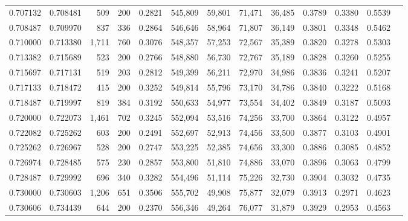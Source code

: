 \begin{tabular}{rrrrrrrrrrrrr}
0.707132 & 0.708481 &   509 & 200 &                                     0.2821 & 545,809 &  59,801 &  71,471 &  36,485 & 0.3789 & 0.3380 & 0.5539 \\
0.708487 & 0.709970 &   837 & 336 &                                     0.2864 & 546,646 &  58,964 &  71,807 &  36,149 & 0.3801 & 0.3348 & 0.5462 \\
0.710000 & 0.713380 & 1,711 & 760 &                                     0.3076 & 548,357 &  57,253 &  72,567 &  35,389 & 0.3820 & 0.3278 & 0.5303 \\
0.713382 & 0.715689 &   523 & 200 &                                     0.2766 & 548,880 &  56,730 &  72,767 &  35,189 & 0.3828 & 0.3260 & 0.5255 \\
0.715697 & 0.717131 &   519 & 203 &                                     0.2812 & 549,399 &  56,211 &  72,970 &  34,986 & 0.3836 & 0.3241 & 0.5207 \\
0.717133 & 0.718472 &   415 & 200 &                                     0.3252 & 549,814 &  55,796 &  73,170 &  34,786 & 0.3840 & 0.3222 & 0.5168 \\
0.718487 & 0.719997 &   819 & 384 &                                     0.3192 & 550,633 &  54,977 &  73,554 &  34,402 & 0.3849 & 0.3187 & 0.5093 \\
0.720000 & 0.722073 & 1,461 & 702 &                                     0.3245 & 552,094 &  53,516 &  74,256 &  33,700 & 0.3864 & 0.3122 & 0.4957 \\
0.722082 & 0.725262 &   603 & 200 &                                     0.2491 & 552,697 &  52,913 &  74,456 &  33,500 & 0.3877 & 0.3103 & 0.4901 \\
0.725262 & 0.726967 &   528 & 200 &                                     0.2747 & 553,225 &  52,385 &  74,656 &  33,300 & 0.3886 & 0.3085 & 0.4852 \\
0.726974 & 0.728485 &   575 & 230 &                                     0.2857 & 553,800 &  51,810 &  74,886 &  33,070 & 0.3896 & 0.3063 & 0.4799 \\
0.728487 & 0.729992 &   696 & 340 &                                     0.3282 & 554,496 &  51,114 &  75,226 &  32,730 & 0.3904 & 0.3032 & 0.4735 \\
0.730000 & 0.730603 & 1,206 & 651 &                                     0.3506 & 555,702 &  49,908 &  75,877 &  32,079 & 0.3913 & 0.2971 & 0.4623 \\
0.730606 & 0.734439 &   644 & 200 &                                     0.2370 & 556,346 &  49,264 &  76,077 &  31,879 & 0.3929 & 0.2953 & 0.4563 \\

\end{tabular}
